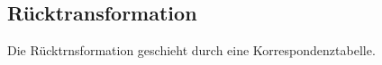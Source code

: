 \documentclass[12pt]{article}
\begin{document}
\subsection{Rücktransformation}
Die Rücktrnsformation geschieht durch eine Korrespondenztabelle.
\end{document}
